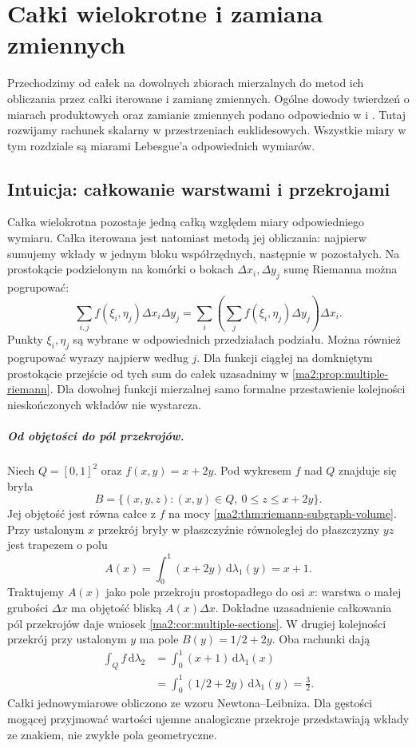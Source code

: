 \chapter{Całki wielokrotne i zamiana zmiennych}
\label{ma2:ch:multiple-integrals}

Przechodzimy od całek na dowolnych zbiorach mierzalnych
do metod ich obliczania przez całki iterowane i zamianę
zmiennych. Ogólne dowody twierdzeń o miarach produktowych
oraz zamianie zmiennych podano odpowiednio w
 i
.
Tutaj rozwijamy rachunek skalarny w przestrzeniach
euklidesowych. Wszystkie miary w tym rozdziale są miarami
Lebesgue'a odpowiednich wymiarów.

\section{Intuicja: całkowanie warstwami i przekrojami}

Całka wielokrotna pozostaje jedną całką
względem miary odpowiedniego wymiaru.
Całka iterowana jest natomiast metodą
jej obliczania: najpierw sumujemy wkłady
w jednym bloku współrzędnych, następnie
w pozostałych. Na prostokącie podzielonym
na komórki o bokach $\Delta x_i,\Delta y_j$
sumę Riemanna można pogrupować:
\[
 \sum_{i,j}f(\xi_i,\eta_j)\Delta x_i\Delta y_j
 =\sum_i\left(\sum_j f(\xi_i,\eta_j)
                      \Delta y_j\right)\Delta x_i.
\]
Punkty $\xi_i,\eta_j$ są wybrane
w odpowiednich przedziałach podziału.
Można również pogrupować wyrazy najpierw
według $j$. Dla funkcji ciągłej na
domkniętym prostokącie przejście od tych
sum do całek uzasadnimy w
\ref{ma2:prop:multiple-riemann}.
Dla dowolnej funkcji mierzalnej samo
formalne przestawienie kolejności
nieskończonych wkładów nie wystarcza.

\paragraph{Od objętości do pól przekrojów.}
Niech $Q=[0,1]^2$ oraz $f(x,y)=x+2y$.
Pod wykresem $f$ nad $Q$ znajduje się
bryła
\[
 B=\{(x,y,z):(x,y)\in Q,\ 0\le z\le x+2y\}.
\]
Jej objętość jest równa całce z $f$
na mocy \ref{ma2:thm:riemann-subgraph-volume}.
Przy ustalonym $x$ przekrój bryły
w płaszczyźnie równoległej do płaszczyzny
$yz$ jest trapezem o polu
\[
 A(x)=\int_0^1(x+2y)\,\mathrm d\lambda_1(y)=x+1.
\]
Traktujemy $A(x)$ jako pole przekroju
prostopadłego do osi $x$:
warstwa o małej grubości $\Delta x$
ma objętość bliską $A(x)\Delta x$.
Dokładne uzasadnienie całkowania pól
przekrojów daje wniosek
\ref{ma2:cor:multiple-sections}.
W drugiej kolejności przekrój przy
ustalonym $y$ ma pole $B(y)=1/2+2y$.
Oba rachunki dają
\[
 \begin{aligned}
 \int_Q f\,\mathrm d\lambda_2
 &=\int_0^1(x+1)\,\mathrm d\lambda_1(x)\\
 &=\int_0^1(1/2+2y)\,\mathrm d\lambda_1(y)
 =\frac32.
 \end{aligned}
\]
Całki jednowymiarowe obliczono ze
wzoru Newtona--Leibniza. Dla gęstości
mogącej przyjmować wartości ujemne
analogiczne przekroje przedstawiają
wkłady ze znakiem, nie zwykłe pola
geometryczne.

